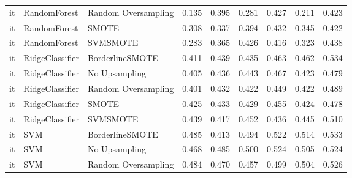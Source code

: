 \begin{tabular}{lllllllll}
      it &                 RandomForest & Random Oversampling & 0.135 &                     0.395 &                 0.281 &                  0.427 &                                   0.211 &     0.423 \\
      it &                 RandomForest &               SMOTE & 0.308 &                     0.337 &                 0.394 &                  0.432 &                                   0.345 &     0.422 \\
      it &                 RandomForest &            SVMSMOTE & 0.283 &                     0.365 &                 0.426 &                  0.416 &                                   0.323 &     0.438 \\
      it &              RidgeClassifier &     BorderlineSMOTE & 0.411 &                     0.439 &                 0.435 &                  0.463 &                                   0.462 &     0.534 \\
      it &              RidgeClassifier &       No Upsampling & 0.405 &                     0.436 &                 0.443 &                  0.467 &                                   0.423 &     0.479 \\
      it &              RidgeClassifier & Random Oversampling & 0.401 &                     0.432 &                 0.422 &                  0.449 &                                   0.422 &     0.489 \\
      it &              RidgeClassifier &               SMOTE & 0.425 &                     0.433 &                 0.429 &                  0.455 &                                   0.424 &     0.478 \\
      it &              RidgeClassifier &            SVMSMOTE & 0.439 &                     0.417 &                 0.452 &                  0.436 &                                   0.445 &     0.510 \\
      it &                          SVM &     BorderlineSMOTE & 0.485 &                     0.413 &                 0.494 &                  0.522 &                                   0.514 &     0.533 \\
      it &                          SVM &       No Upsampling & 0.468 &                     0.485 &                 0.500 &                  0.524 &                                   0.505 &     0.524 \\
      it &                          SVM & Random Oversampling & 0.484 &                     0.470 &                 0.457 &                  0.499 &                                   0.504 &     0.526 \\

\end{tabular}
